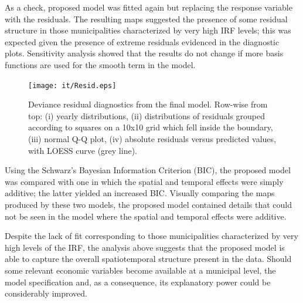 %

As a check, proposed model was fitted again but replacing the response variable with the residuals. The resulting maps suggested the presence of some residual structure in those municipalities characterized by very high IRF levels; this was expected given the presence of extreme residuals evidenced in the diagnostic plots. Sensitivity analysis showed that the results do not change if more basis functions are used for the smooth term in the model. 

\begin{figure}[tbp]
	\centering
		\texttt{[image: it/Resid.eps]}
	\caption{Deviance residual diagnostics from the final model. Row-wise from top: (i) yearly distributions, (ii) distributions of residuals grouped according to squares on a 10x10 grid which fell inside the boundary, (iii) normal Q-Q plot, (iv) absolute residuals versus predicted values, with LOESS curve (grey line).}
	\label{Resid}
\end{figure}

Using the Schwarz's Bayesian Information Criterion (BIC), the proposed model was compared with one in which the spatial and temporal effects were simply additive; the latter yielded an increased BIC. Visually comparing the maps produced by these two models, the proposed model contained details that could not be seen in the model where the spatial and temporal effects were additive.

Despite the lack of fit corresponding to those municipalities characterized by very high levels of the IRF, the analysis above suggests that the proposed model is able to capture the overall spatiotemporal structure present in the data. Should some relevant economic variables become available at a municipal level, the model specification and, as a consequence, its explanatory power could be considerably improved. 

